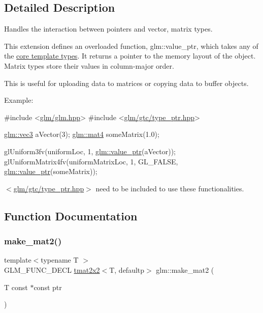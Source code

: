 \subsection{Detailed Description}
Handles the interaction between pointers and vector, matrix types. 

This extension defines an overloaded function, glm\+::value\+\_\+ptr, which takes any of the \hyperlink{group__core__template}{core template types}. It returns a pointer to the memory layout of the object. Matrix types store their values in column-\/major order.

This is useful for uploading data to matrices or copying data to buffer objects.

Example\+: 
\begin{DoxyCode}
\textcolor{preprocessor}{#include <\hyperlink{glm_8hpp}{glm/glm.hpp}>}
\textcolor{preprocessor}{#include <\hyperlink{type__ptr_8hpp}{glm/gtc/type\_ptr.hpp}>}

\hyperlink{structglm_1_1tvec3}{glm::vec3} aVector(3);
\hyperlink{structglm_1_1tmat4x4}{glm::mat4} someMatrix(1.0);

glUniform3fv(uniformLoc, 1, \hyperlink{group__gtc__type__ptr_gaf019636bb8bd7c9efb7c7ce3bb23bcfc}{glm::value\_ptr}(aVector));
glUniformMatrix4fv(uniformMatrixLoc, 1, GL\_FALSE, \hyperlink{group__gtc__type__ptr_gaf019636bb8bd7c9efb7c7ce3bb23bcfc}{glm::value\_ptr}(someMatrix));
\end{DoxyCode}


$<$\hyperlink{type__ptr_8hpp}{glm/gtc/type\+\_\+ptr.\+hpp}$>$ need to be included to use these functionalities. 

\subsection{Function Documentation}
\mbox{\label{group__gtc__type__ptr_ga52a16e333fef7e33ca740779482a8693}} 
\subsubsection{\texorpdfstring{make\+\_\+mat2()}{make\_mat2()}}
{\footnotesize\ttfamily template$<$typename T $>$ \\
G\+L\+M\+\_\+\+F\+U\+N\+C\+\_\+\+D\+E\+CL \hyperlink{structglm_1_1tmat2x2}{tmat2x2}$<$T, defaultp$>$ glm\+::make\+\_\+mat2 (\begin{DoxyParamCaption}\item[{T const $\ast$const}]{ptr }\end{DoxyParamCaption})}

